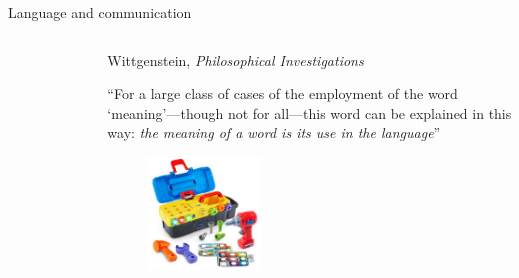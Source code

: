\documentclass[usenames,dvipsnames,notes]{beamer}
\begin{document}
\begin{frame}
    {Language and communication}
    \begin{columns}
        \begin{column}{0.4\textwidth}
            \begin{figure}
            \includegraphics[width=3.5cm]{figures/ludwigwittgenstein}
            \end{figure}
        \end{column}
        \begin{column}{0.6\textwidth}
            Wittgenstein, \textit{Philosophical Investigations}

            \vspace{1em}
            ``For a large class of cases of the employment of the word ‘meaning’---though not for all—this word can be explained in this way: \emph{the meaning of a word is its use in the language}''
            \begin{figure}
            \includegraphics[width=3cm]{figures/tools}
            \end{figure}
        \end{column}
    \end{columns}
\end{frame}
\end{document}

